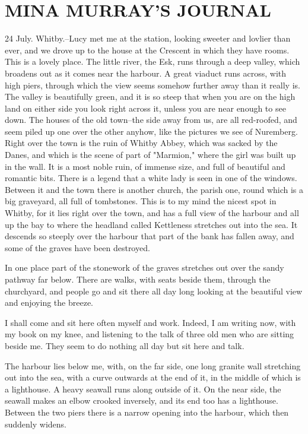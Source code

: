 \chapter{MINA MURRAY'S JOURNAL}

24 July. Whitby.--Lucy met me at the station, looking sweeter and lovlier than ever, and we drove up to the house at the Crescent in which they have rooms. This is a lovely place. The little river, the Esk, runs through a deep valley, which broadens out as it comes near the harbour. A great viaduct runs across, with high piers, through which the view seems somehow further away than it really is. The valley is beautifully green, and it is so steep that when you are on the high land on either side you look right across it, unless you are near enough to see down. The houses of the old town--the side away from us, are all red-roofed, and seem piled up one over the other anyhow, like the pictures we see of Nuremberg. Right over the town is the ruin of Whitby Abbey, which was sacked by the Danes, and which is the scene of part of "Marmion," where the girl was built up in the wall. It is a most noble ruin, of immense size, and full of beautiful and romantic bits. There is a legend that a white lady is seen in one of the windows. Between it and the town there is another church, the parish one, round which is a big graveyard, all full of tombstones. This is to my mind the nicest spot in Whitby, for it lies right over the town, and has a full view of the harbour and all up the bay to where the headland called Kettleness stretches out into the sea. It descends so steeply over the harbour that part of the bank has fallen away, and some of the graves have been destroyed. 

In one place part of the stonework of the graves stretches out over the sandy pathway far below. There are walks, with seats beside them, through the churchyard, and people go and sit there all day long looking at the beautiful view and enjoying the breeze. 

I shall come and sit here often myself and work. Indeed, I am writing now, with my book on my knee, and listening to the talk of three old men who are sitting beside me. They seem to do nothing all day but sit here and talk. 

The harbour lies below me, with, on the far side, one long granite wall stretching out into the sea, with a curve outwards at the end of it, in the middle of which is a lighthouse. A heavy seawall runs along outside of it. On the near side, the seawall makes an elbow crooked inversely, and its end too has a lighthouse. Between the two piers there is a narrow opening into the harbour, which then suddenly widens. 

